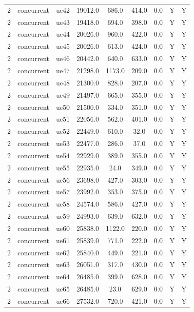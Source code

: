 \begin{table}[ht]
\begin{tabular}{|c|c|c|c|c|c|c|c|c|}
2 & concurrent & ue42 & 19012.0 & 686.0 & 414.0 & 0.0 & Y & Y \\
2 & concurrent & ue43 & 19418.0 & 694.0 & 398.0 & 0.0 & Y & Y \\
2 & concurrent & ue44 & 20026.0 & 960.0 & 422.0 & 0.0 & Y & Y \\
2 & concurrent & ue45 & 20026.0 & 613.0 & 424.0 & 0.0 & Y & Y \\
2 & concurrent & ue46 & 20442.0 & 640.0 & 633.0 & 0.0 & Y & Y \\
2 & concurrent & ue47 & 21298.0 & 1173.0 & 209.0 & 0.0 & Y & Y \\
2 & concurrent & ue48 & 21300.0 & 828.0 & 207.0 & 0.0 & Y & Y \\
2 & concurrent & ue49 & 21497.0 & 665.0 & 355.0 & 0.0 & Y & Y \\
2 & concurrent & ue50 & 21500.0 & 334.0 & 351.0 & 0.0 & Y & Y \\
2 & concurrent & ue51 & 22056.0 & 562.0 & 401.0 & 0.0 & Y & Y \\
2 & concurrent & ue52 & 22449.0 & 610.0 & 32.0 & 0.0 & Y & Y \\
2 & concurrent & ue53 & 22477.0 & 286.0 & 37.0 & 0.0 & Y & Y \\
2 & concurrent & ue54 & 22929.0 & 389.0 & 355.0 & 0.0 & Y & Y \\
2 & concurrent & ue55 & 22935.0 & 24.0 & 349.0 & 0.0 & Y & Y \\
2 & concurrent & ue56 & 23698.0 & 427.0 & 303.0 & 0.0 & Y & Y \\
2 & concurrent & ue57 & 23992.0 & 353.0 & 375.0 & 0.0 & Y & Y \\
2 & concurrent & ue58 & 24574.0 & 586.0 & 427.0 & 0.0 & Y & Y \\
2 & concurrent & ue59 & 24993.0 & 639.0 & 632.0 & 0.0 & Y & Y \\
2 & concurrent & ue60 & 25838.0 & 1122.0 & 220.0 & 0.0 & Y & Y \\
2 & concurrent & ue61 & 25839.0 & 771.0 & 222.0 & 0.0 & Y & Y \\
2 & concurrent & ue62 & 25840.0 & 449.0 & 221.0 & 0.0 & Y & Y \\
2 & concurrent & ue63 & 26051.0 & 317.0 & 430.0 & 0.0 & Y & Y \\
2 & concurrent & ue64 & 26485.0 & 399.0 & 628.0 & 0.0 & Y & Y \\
2 & concurrent & ue65 & 26485.0 & 23.0 & 629.0 & 0.0 & Y & Y \\
2 & concurrent & ue66 & 27532.0 & 720.0 & 421.0 & 0.0 & Y & Y \\

\end{tabular}
\end{table}
